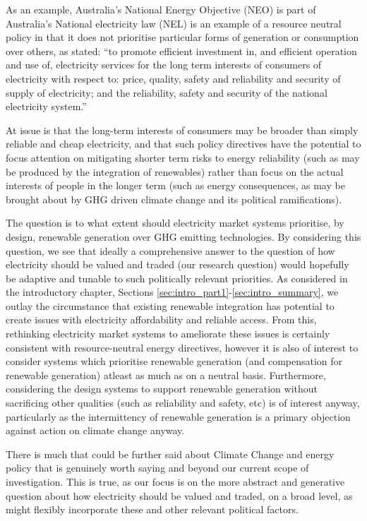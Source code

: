 As an example, Australia's National Energy Objective (NEO) is part of Australia's National electricity law (NEL) is an example of a resource neutral policy in that it does not prioritise particular forms of generation or consumption over others, as stated: ``to promote efficient investment in, and efficient operation and use of, electricity services for the long term interests of consumers of electricity with respect to: price, quality, safety and reliability and security of supply of electricity; and the reliability, safety and security of the national electricity system.''

At issue is that the long-term interests of consumers may be broader than simply reliable and cheap electricity, and that such policy directives have the potential to focus attention on mitigating shorter term risks to energy reliability (such as may be produced by the integration of renewables) rather than focus on the actual interests of people in the longer term (such as energy consequences, as may be brought about by GHG driven climate change and its political ramifications).

The question is to what extent should electricity market systems prioritise, by design, renewable generation over GHG emitting technologies.
By considering this question, we see that ideally a comprehensive answer to the question of how electricity should be valued and traded (our research question) would hopefully be adaptive and tunable to such politically relevant priorities.
As considered in the introductory chapter, Sections \ref{sec:intro_part1}-\ref{sec:intro_summary}, we outlay the circumstance that existing renewable integration has potential to create issues with electricity affordability and reliable access.
From this, rethinking electricity market systems to ameliorate these issues is certainly consistent with resource-neutral energy directives, however it is also of interest to consider systems which prioritise renewable generation (and compensation for renewable generation) atleast as much as on a neutral basis.
Furthermore, considering the design systems to support renewable generation without sacrificing other qualities (such as reliability and safety, etc) is of interest anyway, particularly as the intermittency of renewable generation is a primary objection against action on climate change anyway. \citep{climate_change2}

There is much that could be further said about Climate Change and energy policy that is genuinely worth saying and beyond our current scope of investigation.
This is true, as our focus is on the more abstract and generative question about how electricity should be valued and traded, on a broad level, as might flexibly incorporate these and other relevant political factors.






